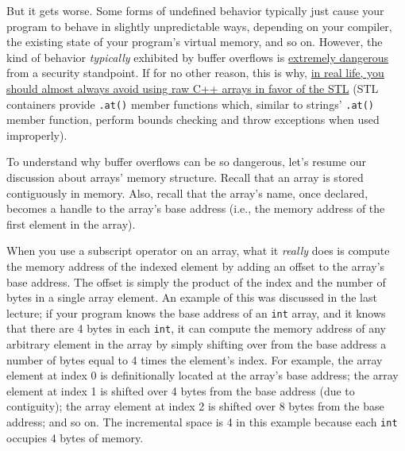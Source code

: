 \documentclass{article}
\begin{document}
But it gets worse. Some forms of undefined behavior typically just cause your program to behave in slightly unpredictable ways, depending on your compiler, the existing state of your program's virtual memory, and so on. However, the kind of behavior \textit{typically} exhibited by buffer overflows is \ul{extremely dangerous} from a security standpoint. If for no other reason, this is why, \ul{in real life, you should almost always avoid using raw C++ arrays in favor of the STL} (STL containers provide \texttt{.at()} member functions which, similar to strings' \texttt{.at()} member function, perform bounds checking and throw exceptions when used improperly).

To understand why buffer overflows can be so dangerous, let's resume our discussion about arrays' memory structure. Recall that an array is stored contiguously in memory. Also, recall that the array's name, once declared, becomes a handle to the array's base address (i.e., the memory address of the first element in the array).

When you use a subscript operator on an array, what it \textit{really} does is compute the memory address of the indexed element by adding an offset to the array's base address. The offset is simply the product of the index and the number of bytes in a single array element. An example of this was discussed in the last lecture; if your program knows the base address of an \texttt{int} array, and it knows that there are 4 bytes in each \texttt{int}, it can compute the memory address of any arbitrary element in the array by simply shifting over from the base address a number of bytes equal to 4 times the element's index. For example, the array element at index 0 is definitionally located at the array's base address; the array element at index 1 is shifted over 4 bytes from the base address (due to contiguity); the array element at index 2 is shifted over 8 bytes from the base address; and so on. The incremental space is 4 in this example because each \texttt{int} occupies 4 bytes of memory.
\end{document}
